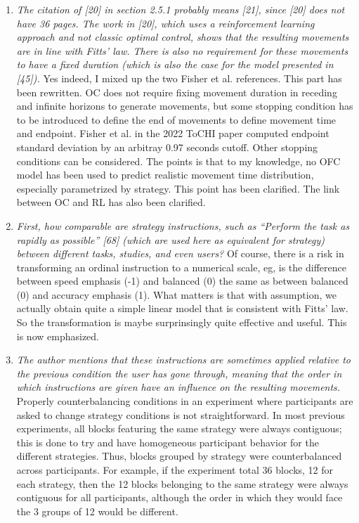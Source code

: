 \documentclass{article}
\begin{document}
\begin{enumerate}
    \item \textit{The citation of [20] in section 2.5.1 probably means [21], since [20] does not have 36 pages. The work in [20], which uses a reinforcement learning approach and not classic optimal control, shows that the resulting movements are in line with Fitts’ law. There is also no requirement for these movements to have a fixed duration (which is also the case for the model presented in [45]).} Yes indeed, I mixed up the two Fisher et al. references. This part has been rewritten. OC does not require fixing movement duration in receding and infinite horizons to generate movements, but some stopping condition has to be introduced to define the end of movements to define movement time and endpoint. Fisher et al. in the 2022 ToCHI paper computed endpoint standard deviation by an arbitray 0.97 seconds cutoff. Other stopping conditions can be considered. The points is that to my knowledge, no OFC model has been used to predict realistic movement time distribution, especially parametrized by strategy. This point has been clarified. The link between OC and RL has also been clarified.
    \item \textit{First, how comparable are strategy instructions, such as “Perform the task as rapidly as possible” [68] (which are used here as equivalent for strategy) between different tasks, studies, and even users? } Of course, there is a risk in transforming an ordinal instruction  to a numerical scale, eg, is the difference between speed emphasis (-1) and balanced (0) the same as between balanced (0) and accuracy emphasis (1). What matters is that with assumption, we actually obtain quite a simple linear model that is consistent with Fitts' law. So the transformation is maybe surprinsingly quite effective and useful. This is now emphasized.
    \item \textit{The author mentions that these instructions are sometimes applied relative to the previous condition the user has gone through, meaning that the order in which instructions are given have an influence on the resulting movements. } Properly counterbalancing conditions in an experiment where participants are asked to change strategy conditions is not straightforward. In most previous experiments, all blocks featuring the same strategy were always contiguous; this is done to try and have homogeneous participant behavior for the different strategies. Thus, blocks grouped by strategy were counterbalanced across participants. For example, if the experiment total 36 blocks, 12 for each strategy, then the 12 blocks belonging to the same strategy were always contiguous for all participants, although the order in which they would face the 3 groups of 12 would be different.    

\end{enumerate}
\end{document}
